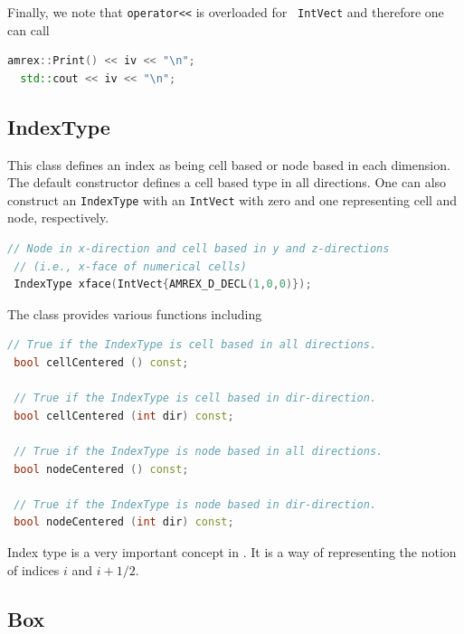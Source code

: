 {Finally, we note that {\tt operator<<} is overloaded for {\tt
  IntVect} and therefore one can call
\begin{lstlisting}[language=cpp]
  amrex::Print() << iv << "\n";
  std::cout << iv << "\n";
\end{lstlisting}

\subsection{IndexType}

This class defines an index as being cell based or node based in
each dimension.  The default constructor defines a cell based type in
all directions.  One can also construct an {\tt IndexType} with an
{\tt IntVect} with zero and one representing cell and node,
respectively.
\begin{lstlisting}[language=cpp]
 // Node in x-direction and cell based in y and z-directions
 // (i.e., x-face of numerical cells)
 IndexType xface(IntVect{AMREX_D_DECL(1,0,0)});
\end{lstlisting}
The class provides various functions including
\begin{lstlisting}[language=cpp]
 // True if the IndexType is cell based in all directions.
 bool cellCentered () const;

 // True if the IndexType is cell based in dir-direction.
 bool cellCentered (int dir) const;

 // True if the IndexType is node based in all directions.
 bool nodeCentered () const;

 // True if the IndexType is node based in dir-direction.
 bool nodeCentered (int dir) const;
\end{lstlisting}

Index type is a very important concept in \amrex.  It is a way of
representing the notion of indices $i$ and $i+1/2$.

\subsection{Box}

}
